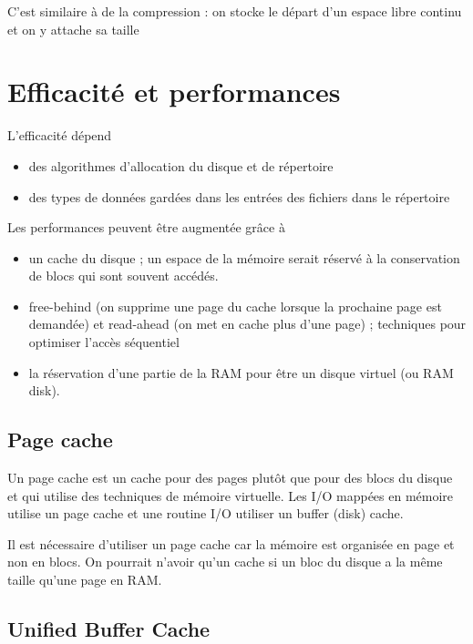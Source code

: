 	C'est similaire à de la compression : on stocke le départ d'un espace libre continu et on y attache sa taille
	
\section{Efficacité et performances}

L'efficacité dépend

\begin{itemize}
	\item des algorithmes d'allocation du disque et de répertoire
	\item des types de données gardées dans les entrées des fichiers dans le répertoire
\end{itemize}

Les performances peuvent être augmentée grâce à

\begin{itemize}
	\item un cache du disque ; un espace de la mémoire serait réservé à la conservation de blocs qui sont souvent accédés.
	\item free-behind (on supprime une page du cache lorsque la prochaine page est demandée) et read-ahead (on met en cache plus d'une page) ; techniques pour optimiser l'accès séquentiel
	\item la réservation d'une partie de la RAM pour être un disque virtuel (ou RAM disk).
\end{itemize}

	\subsection{Page cache}
	
	Un page cache est un cache pour des pages plutôt que pour des blocs du disque et qui utilise des techniques de mémoire virtuelle. Les I/O mappées en mémoire utilise un page cache et une routine I/O utiliser un buffer (disk) cache.
	
	
	Il est nécessaire d'utiliser un page cache car la mémoire est organisée en page et non en blocs. On pourrait n'avoir qu'un cache si un bloc du disque a la même taille qu'une page en RAM.

	\subsection{Unified Buffer Cache}
	
